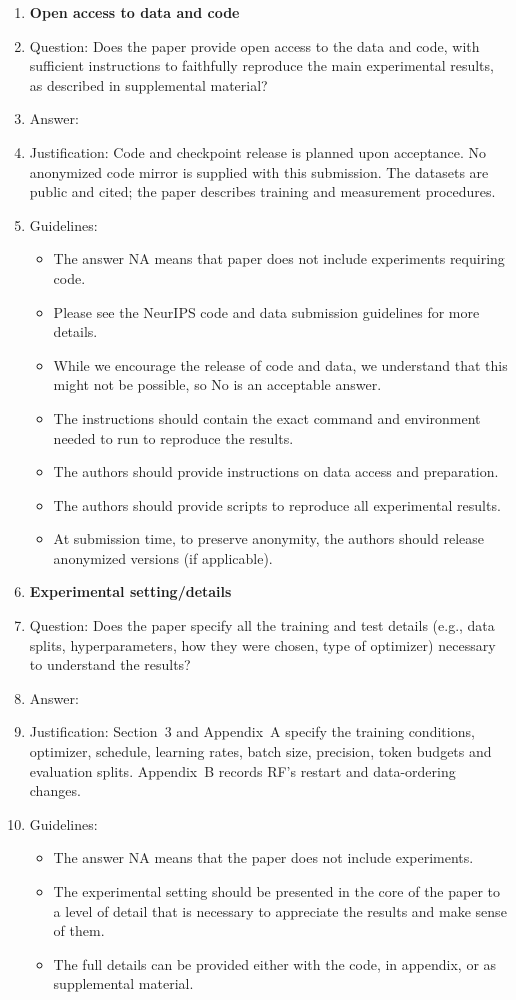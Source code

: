 \begin{enumerate}
\item {\bf Open access to data and code}
    \item[] Question: Does the paper provide open access to the data and code, with sufficient instructions to faithfully reproduce the main experimental results, as described in supplemental material?
    \item[] Answer: \answerNo{}
    \item[] Justification: Code and checkpoint release is planned upon acceptance. No anonymized code mirror is supplied with this submission. The datasets are public and cited; the paper describes training and measurement procedures.
    \item[] Guidelines:
    \begin{itemize}
        \item The answer NA means that paper does not include experiments requiring code.
        \item Please see the NeurIPS code and data submission guidelines for more details.
        \item While we encourage the release of code and data, we understand that this might not be possible, so No is an acceptable answer.
        \item The instructions should contain the exact command and environment needed to run to reproduce the results.
        \item The authors should provide instructions on data access and preparation.
        \item The authors should provide scripts to reproduce all experimental results.
        \item At submission time, to preserve anonymity, the authors should release anonymized versions (if applicable).
    \end{itemize}

\item {\bf Experimental setting/details}
    \item[] Question: Does the paper specify all the training and test details (e.g., data splits, hyperparameters, how they were chosen, type of optimizer) necessary to understand the results?
    \item[] Answer: \answerYes{}
    \item[] Justification: Section~3 and Appendix~A specify the training conditions, optimizer, schedule, learning rates, batch size, precision, token budgets and evaluation splits. Appendix~B records RF's restart and data-ordering changes.
    \item[] Guidelines:
    \begin{itemize}
        \item The answer NA means that the paper does not include experiments.
        \item The experimental setting should be presented in the core of the paper to a level of detail that is necessary to appreciate the results and make sense of them.
        \item The full details can be provided either with the code, in appendix, or as supplemental material.
    \end{itemize}


\end{enumerate}
